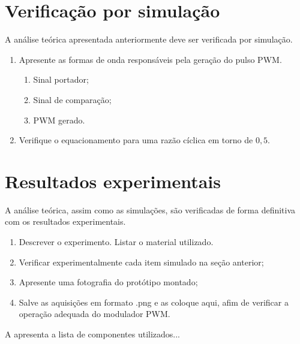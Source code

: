 \section{Verificação por simulação}


A análise teórica apresentada anteriormente deve ser verificada por simulação. 
 
\begin{enumerate}									
	\item   Apresente as formas de onda responsáveis pela geração do pulso PWM.
	\begin{enumerate}
		\item Sinal portador;
		\item Sinal de comparação;
		\item PWM gerado.
	\end{enumerate}
	\item  Verifique o equacionamento para uma razão cíclica em torno de $0,5$.
\end{enumerate}





\section{Resultados experimentais}


A análise teórica, assim como as simulações, são verificadas de forma definitiva com os resultados experimentais.
\begin{enumerate}									
	\item   Descrever o experimento. Listar o material utilizado.  
	\item  Verificar experimentalmente cada item simulado na seção anterior;
	\item  Apresente uma fotografia do protótipo montado;
	\item  Salve as aquisições em formato .png e as coloque aqui, afim de verificar a operação adequada do modulador PWM.
\end{enumerate}

A  apresenta a lista de componentes utilizados...

